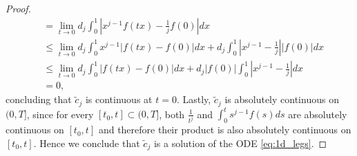 \documentclass{article}
\theoremstyle{definition}
\newcommand{\derivative}[1]{#1^{\prime}}
\newcommand{\abs}[1]{\left| #1 \right|}
\begin{document}
\begin{proof}
\begin{align*}
        &= \lim_{t \to 0} 
        d_j \int_0^1 \abs{x^{j-1} f(tx) - \frac{1}{j}f(0) } dx \\
        &\leq \lim_{t \to 0} 
        d_j \int_0^1 x^{j-1} |f(tx) - f(0)| dx  + d_j \int_0^1 \abs{x^{j-1} - \frac{1}{j}} |f(0)| dx \\
        &\leq \lim_{t \to 0} 
        d_j \int_0^1 |f(tx) - f(0)| dx  
        + d_j |f(0)| \int_0^1 \abs{x^{j-1} - \frac{1}{j} }  dx \\
        &= 0,
    \end{align*}
    concluding that $\tilde{c}_j$ is continuous at $t=0$. 
    Lastly, $\tilde{c}_j$ is absolutely continuous on $(0,T]$, since for every $[t_0,t] \subset (0,T]$, 
    both $\frac{1}{t^j}$ and $\int^t_0 s^{j-1} f(s) ds$ are absolutely continuous on $[t_0,t]$ and therefore their product is also absolutely continuous on $[t_0,t]$. 
    Hence we conclude that $\tilde{c}_j$ is a solution of the ODE \eqref{eq:1d_legs}. 


\end{proof}
\end{document}
